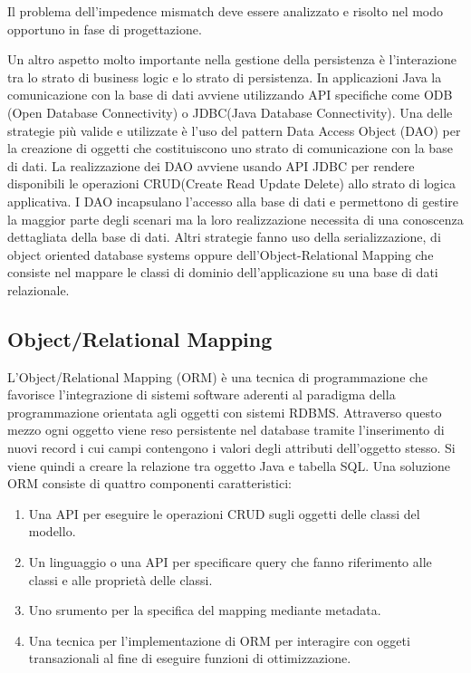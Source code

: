 Il problema dell'impedence mismatch deve essere analizzato e risolto nel modo opportuno in fase di progettazione. 

Un altro aspetto molto importante nella gestione della persistenza \`e l'interazione tra lo strato di business logic e lo strato di persistenza.
In applicazioni Java la comunicazione con la base di dati avviene utilizzando API specifiche come ODB (Open Database Connectivity) o JDBC(Java Database Connectivity). 
Una delle strategie pi\`u valide e utilizzate \`e l'uso del pattern Data Access Object (DAO) per la creazione di oggetti che costituiscono uno strato di comunicazione con la base di dati. 
La realizzazione dei DAO avviene usando API JDBC
per rendere disponibili le operazioni CRUD(Create Read Update Delete) allo strato di logica applicativa. I DAO incapsulano l'accesso alla base di dati e permettono di gestire la maggior parte degli scenari ma la loro realizzazione necessita di una conoscenza dettagliata della base di dati.
Altri strategie fanno uso della serializzazione, di object oriented database systems oppure dell'Object-Relational Mapping che consiste nel mappare le classi di dominio dell'applicazione su una base di dati relazionale. 

\subsection{Object/Relational Mapping}
L'Object/Relational Mapping (ORM) \`e una tecnica di programmazione che favorisce l'integrazione di sistemi software aderenti al paradigma della programmazione orientata agli oggetti con sistemi RDBMS.
Attraverso questo mezzo ogni oggetto viene reso persistente nel database tramite l'inserimento di nuovi record i cui campi contengono i valori degli attributi dell'oggetto stesso. Si viene quindi a creare la relazione tra oggetto Java e tabella SQL. Una soluzione ORM consiste di quattro componenti caratteristici:
\begin{enumerate}
\item Una API per eseguire le operazioni CRUD sugli oggetti delle classi del modello.
\item  Un linguaggio  o una API  per specificare query che fanno riferimento alle classi e alle propriet\`a delle classi.
\item Uno srumento per la specifica del mapping mediante metadata.
\item Una tecnica per l'implementazione di ORM  per interagire con oggeti transazionali al fine di eseguire funzioni di ottimizzazione.
\end{enumerate}

